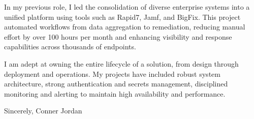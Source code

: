\documentclass[letterpaper,11pt]{article}
\begin{document}
In my previous role, I led the consolidation of diverse enterprise systems into a unified platform using tools such as Rapid7, Jamf, and BigFix. This project automated workflows from data aggregation to remediation, reducing manual effort by over 100 hours per month and enhancing visibility and response capabilities across thousands of endpoints.

\vspace{16pt}

I am adept at owning the entire lifecycle of a solution, from design through deployment and operations. My projects have included robust system architecture, strong authentication and secrets management, disciplined monitoring and alerting to maintain high availability and performance.

\vspace{16pt}

Sincerely,  
Conner Jordan
\end{document}
